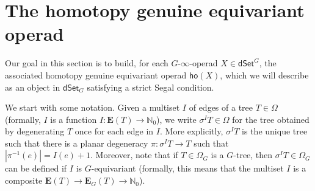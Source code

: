 \documentclass[a4paper,10pt
,draft
]{article}%
\renewcommand{\1}{\ensuremath{\mathbb{id}}}
\begin{document}
\newpage

\section{The homotopy genuine equivariant operad}


Our goal in this section is to build,
for each $G$-$\infty$-operad $X \in \mathsf{dSet}^G$,
the associated homotopy genuine equivariant operad
$\mathsf{ho} (X)$,
which we will describe as an object in
$\mathsf{dSet}_G$
satisfying a strict Segal condition.


We start with some notation. 
Given a multiset $I$ of edges of a tree $T \in \Omega$
(formally, $I$ is a function 
$I \colon \boldsymbol{E}(T) \to \mathbb{N}_0$),
we write $\sigma^I T \in \Omega$
for the tree obtained by degenerating $T$ once for each edge in $I$.
More explicitly, $\sigma^I T$ is the unique tree such that there is a planar degeneracy
$\pi \colon \sigma^I T \to T$
such that $|\pi^{-1}(e)| = I(e) + 1$.
Moreover,
note that if $T\in \Omega_G$ is a $G$-tree, 
then $\sigma^{I} T \in \Omega_{G}$
can be defined if $I$ is $G$-equivariant
(formally, this means that the multiset $I$ is a composite
$\boldsymbol{E}(T) \to \boldsymbol{E}_G(T)
\to \mathbb{N}_0$).
\end{document}
